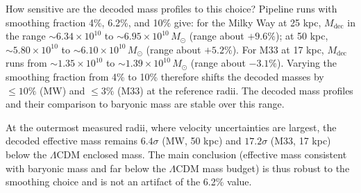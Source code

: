 \documentclass[aps,amsmath,amssymb,reprint,nofootinbib]{revtex4-2}
\begin{document}
How sensitive are the decoded mass profiles to this choice? Pipeline runs with smoothing fraction 4\%, 6.2\%, and 10\% give: for the Milky Way at 25 kpc, $M_{\mathrm{dec}}$ in the range $\sim 6.34\times10^{10}$ to $\sim 6.95\times10^{10}\,M_\odot$ (range about $+9.6\%$); at 50 kpc, $\sim 5.80\times10^{10}$ to $\sim 6.10\times10^{10}\,M_\odot$ (range about $+5.2\%$). For M33 at 17 kpc, $M_{\mathrm{dec}}$ runs from $\sim 1.35\times10^{10}$ to $\sim 1.39\times10^{10}\,M_\odot$ (range about $-3.1\%$). Varying the smoothing fraction from 4\% to 10\% therefore shifts the decoded masses by $\le 10\%$ (MW) and $\le 3\%$ (M33) at the reference radii. The decoded mass profiles and their comparison to baryonic mass are stable over this range.

At the outermost measured radii, where velocity uncertainties are largest, the decoded effective mass remains $6.4\sigma$ (MW, 50 kpc) and $17.2\sigma$ (M33, 17 kpc) below the $\Lambda$CDM enclosed mass. The main conclusion (effective mass consistent with baryonic mass and far below the $\Lambda$CDM mass budget) is thus robust to the smoothing choice and is not an artifact of the 6.2\% value.


\end{document}
